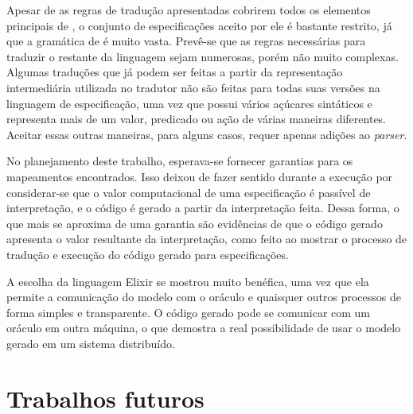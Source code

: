Apesar de as regras de tradução apresentadas cobrirem todos os elementos
principais de \TLAA, o conjunto de especificações aceito por ele é bastante
restrito, já que a gramática de \TLA é muito vasta. Prevê-se que as
regras necessárias para traduzir o restante da linguagem sejam numerosas, porém
não muito complexas. Algumas traduções que já podem ser feitas a partir da
representação intermediária utilizada no tradutor não são feitas para todas suas
versões na linguagem de especificação, uma vez que \TLA possui vários açúcares
sintáticos e representa mais de um valor, predicado ou ação de várias maneiras
diferentes. Aceitar essas outras maneiras, para alguns casos, requer apenas
adições ao \textit{parser}.

No planejamento deste trabalho, esperava-se fornecer garantias para os
mapeamentos encontrados. Isso deixou de fazer sentido durante a execução por
considerar-se que o valor computacional de uma especificação é passível de
interpretação, e o código é gerado a partir da interpretação feita. Dessa forma,
o que mais se aproxima de uma garantia são evidências de que o código gerado
apresenta o valor resultante da interpretação, como feito ao mostrar o processo
de tradução e execução do código gerado para especificações.

A escolha da linguagem Elixir se mostrou muito benéfica, uma vez que ela permite
a comunicação do modelo com o oráculo e quaisquer outros processos de forma
simples e transparente. O código gerado pode se comunicar com um oráculo em
outra máquina, o que demostra a real possibilidade de usar o modelo gerado em um
sistema distribuído.

\section{Trabalhos futuros}

